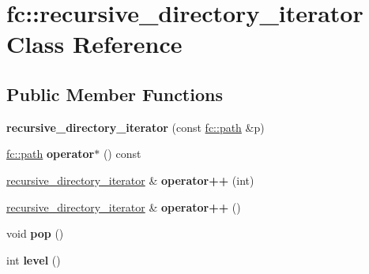 \hypertarget{classfc_1_1recursive__directory__iterator}{}\section{fc\+:\+:recursive\+\_\+directory\+\_\+iterator Class Reference}
\label{classfc_1_1recursive__directory__iterator}
\subsection*{Public Member Functions}
\begin{DoxyCompactItemize}
\item 
\mbox{\label{classfc_1_1recursive__directory__iterator_abb3ef95a131236434e2baab70e558b12}} 
{\bfseries recursive\+\_\+directory\+\_\+iterator} (const \mbox{\hyperlink{classfc_1_1path}{fc\+::path}} \&p)
\item 
\mbox{\label{classfc_1_1recursive__directory__iterator_ab1110dc12bc36920131fcd6fb7f69037}} 
\mbox{\hyperlink{classfc_1_1path}{fc\+::path}} {\bfseries operator$\ast$} () const
\item 
\mbox{\label{classfc_1_1recursive__directory__iterator_a2c0680d263d1861ebd364d4f131d5237}} 
\mbox{\hyperlink{classfc_1_1recursive__directory__iterator}{recursive\+\_\+directory\+\_\+iterator}} \& {\bfseries operator++} (int)
\item 
\mbox{\label{classfc_1_1recursive__directory__iterator_aee0d9246b8ea4c0a35afc3f1fc671e0c}} 
\mbox{\hyperlink{classfc_1_1recursive__directory__iterator}{recursive\+\_\+directory\+\_\+iterator}} \& {\bfseries operator++} ()
\item 
\mbox{\label{classfc_1_1recursive__directory__iterator_a2236853f6f182800c0face455ceb96b3}} 
void {\bfseries pop} ()
\item 
\mbox{\label{classfc_1_1recursive__directory__iterator_a24a3bbd3ef729f1b0be5bb3d45339ca8}} 
int {\bfseries level} ()
\end{DoxyCompactItemize}
